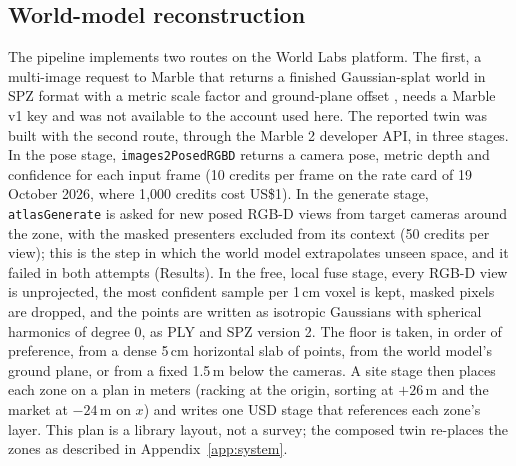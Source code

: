\documentclass{article}
\newcommand{\code}[1]{\texttt{\small #1}}
\begin{document}
\subsection{World-model reconstruction}
The pipeline implements two routes on the World Labs platform. The first, a
multi-image request to Marble that returns a finished Gaussian-splat world in
SPZ format \cite{spz} with a metric scale factor and ground-plane offset
\cite{worldlabs_spz}, needs a Marble v1 key and was not available to the
account used here. The reported twin was built with the second route, through
the Marble 2 developer API, in three stages. In the pose stage,
\code{images2PosedRGBD} returns a camera pose, metric depth and confidence for
each input frame (10 credits per frame on the rate card of 19 October 2026,
where 1{,}000 credits cost US\$1). In the generate stage, \code{atlasGenerate}
is asked for new posed RGB-D views from target cameras around the zone, with
the masked presenters excluded from its context (50 credits per view); this is
the step in which the world model extrapolates unseen space, and it failed in
both attempts (Results). In the free, local fuse stage, every RGB-D view is
unprojected, the most confident sample per 1\,cm voxel is kept, masked pixels
are dropped, and the points are written as isotropic Gaussians with spherical
harmonics of degree 0, as PLY and SPZ version 2. The floor is taken, in order
of preference, from a dense 5\,cm horizontal slab of points, from the world
model's ground plane, or from a fixed 1.5\,m below the cameras. A site stage
then places each zone on a plan in meters (racking at the origin, sorting at
$+26$\,m and the market at $-24$\,m on $x$) and writes one USD stage that
references each zone's layer. This plan is a library layout, not a survey;
the composed twin re-places the zones as described in Appendix~\ref{app:system}.
\end{document}
